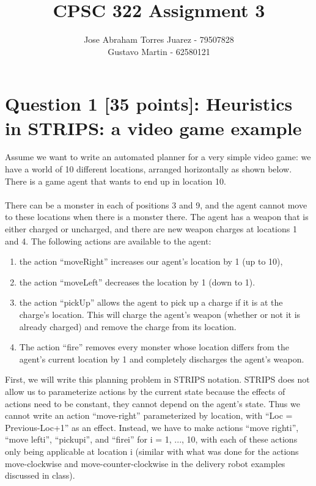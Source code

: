 \documentclass{article}
\begin{document}
\title{CPSC 322 Assignment 3}
\author{
    Jose Abraham Torres Juarez - 79507828 \\
    Gustavo Martin - 62580121
}
\date{}
\maketitle
\vspace{-2em}


\section{Question 1 [35 points]: Heuristics in STRIPS: a video game example}
Assume we want to write an automated planner for a very simple video game: we have a world of 10 different locations, arranged horizontally as shown below. There is a game agent that wants to end up in location 10. \\ \\
There can be a monster in each of positions 3 and 9, and the agent cannot move to these locations when there is a monster there. The agent has a weapon that is either charged or uncharged, and there are new weapon charges at locations 1 and 4. The following actions are available to the agent: \\
\begin{enumerate}
    \item the action “moveRight” increases our agent’s location by 1 (up to 10),
    \item the action “moveLeft” decreases the location by 1 (down to 1).
    \item the action “pickUp” allows the agent to pick up a charge if it is at the charge’s location. This will charge the agent’s weapon (whether or not it is already charged) and remove the charge from its location.
    \item The action “fire” removes every monster whose location differs from the agent’s current location by 1 and completely discharges the agent’s weapon.
\end{enumerate}
First, we will write this planning problem in STRIPS notation. STRIPS does not allow us to parameterize actions by the current state because the effects of actions need to be constant, they cannot depend on the agent’s state. Thus we cannot write an action “move-right” parameterized by location, with “Loc = Previous-Loc+1” as an effect. Instead, we have to make actions “move righti”, “move lefti”, “pickupi”, and “firei” for i = 1, ..., 10, with each of these actions only being applicable at location i (similar with what was done for the actions move-clockwise and move-counter-clockwise in the delivery robot examples discussed in class).
\end{document}
